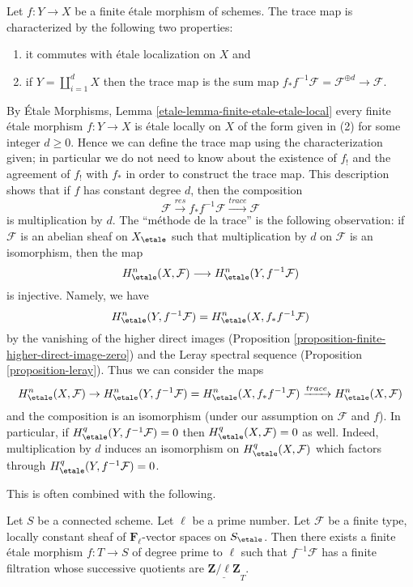 \noindent
Let $f : Y \to X$ be a finite \'etale morphism of schemes. The trace map is
characterized by the following two properties:
\begin{enumerate}
\item it commutes with \'etale localization on $X$ and
\item if $Y = \coprod_{i = 1}^d X$ then the trace map is
the sum map $f_*f^{-1} \mathcal{F} = \mathcal{F}^{\oplus d} \to \mathcal{F}$.
\end{enumerate}
By \'Etale Morphisms, Lemma \ref{etale-lemma-finite-etale-etale-local}
every finite \'etale morphism $f : Y \to X$ is \'etale locally on $X$
of the form given in (2) for some integer $d \geq 0$. Hence we
can define the trace map using the characterization given; in particular
we do not need to know about the existence of $f_!$ and the agreement
of $f_!$ with $f_*$ in order to construct the trace map.
This description shows that if $f$ has constant degree $d$, then
the composition
$$
\mathcal{F} \xrightarrow{res}
f_* f^{-1} \mathcal{F} \xrightarrow{trace}
\mathcal{F}
$$
is multiplication by $d$. The ``m\'ethode de la trace''
is the following observation: if $\mathcal{F}$
is an abelian sheaf on $X_\etale$ such that multiplication by $d$
on $\mathcal{F}$ is an isomorphism, then the map
$$
H^n_\etale(X, \mathcal{F}) \longrightarrow H^n_\etale(Y, f^{-1}\mathcal{F})
$$
is injective. Namely, we have
$$
H^n_\etale(Y, f^{-1}\mathcal{F}) = H^n_\etale(X, f_*f^{-1}\mathcal{F})
$$
by the vanishing of the higher direct images
(Proposition \ref{proposition-finite-higher-direct-image-zero})
and the Leray spectral sequence
(Proposition \ref{proposition-leray}).
Thus we can consider the maps
$$
H^n_\etale(X, \mathcal{F}) \to
H^n_\etale(Y, f^{-1}\mathcal{F})= H^n_\etale(X, f_*f^{-1}\mathcal{F})
\xrightarrow{trace}
H^n_\etale(X, \mathcal{F})
$$
and the composition is an isomorphism (under our assumption on $\mathcal{F}$
and $f$). In particular, if
$H_\etale^q(Y, f^{-1}\mathcal{F}) = 0$ then
$H_\etale^q(X, \mathcal{F}) = 0$ as well.
Indeed, multiplication by $d$ induces an
isomorphism on $H_\etale^q(X, \mathcal{F})$ which factors through
$H_\etale^q(Y, f^{-1}\mathcal{F})= 0$.

\medskip\noindent
This is often combined with the following.

\begin{lemma}
\label{lemma-pullback-filtered}
Let $S$ be a connected scheme. Let $\ell$ be a prime number. Let
$\mathcal{F}$ be a finite type, locally constant sheaf of
$\mathbf{F}_\ell$-vector spaces on $S_\etale$.
Then there exists a finite \'etale morphism
$f : T \to S$ of degree prime to $\ell$ such that $f^{-1}\mathcal{F}$
has a finite filtration whose successive quotients are
$\underline{\mathbf{Z}/\ell\mathbf{Z}}_T$.
\end{lemma}

